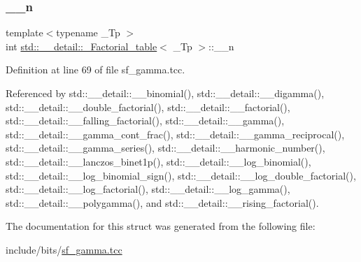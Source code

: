 \subsubsection{\texorpdfstring{\+\_\+\+\_\+n}{\_\_n}}
{\footnotesize\ttfamily template$<$typename \+\_\+\+Tp $>$ \\
int \hyperlink{structstd_1_1____detail_1_1__Factorial__table}{std\+::\+\_\+\+\_\+detail\+::\+\_\+\+Factorial\+\_\+table}$<$ \+\_\+\+Tp $>$\+::\+\_\+\+\_\+n}



Definition at line 69 of file sf\+\_\+gamma.\+tcc.



Referenced by std\+::\+\_\+\+\_\+detail\+::\+\_\+\+\_\+binomial(), std\+::\+\_\+\+\_\+detail\+::\+\_\+\+\_\+digamma(), std\+::\+\_\+\+\_\+detail\+::\+\_\+\+\_\+double\+\_\+factorial(), std\+::\+\_\+\+\_\+detail\+::\+\_\+\+\_\+factorial(), std\+::\+\_\+\+\_\+detail\+::\+\_\+\+\_\+falling\+\_\+factorial(), std\+::\+\_\+\+\_\+detail\+::\+\_\+\+\_\+gamma(), std\+::\+\_\+\+\_\+detail\+::\+\_\+\+\_\+gamma\+\_\+cont\+\_\+frac(), std\+::\+\_\+\+\_\+detail\+::\+\_\+\+\_\+gamma\+\_\+reciprocal(), std\+::\+\_\+\+\_\+detail\+::\+\_\+\+\_\+gamma\+\_\+series(), std\+::\+\_\+\+\_\+detail\+::\+\_\+\+\_\+harmonic\+\_\+number(), std\+::\+\_\+\+\_\+detail\+::\+\_\+\+\_\+lanczos\+\_\+binet1p(), std\+::\+\_\+\+\_\+detail\+::\+\_\+\+\_\+log\+\_\+binomial(), std\+::\+\_\+\+\_\+detail\+::\+\_\+\+\_\+log\+\_\+binomial\+\_\+sign(), std\+::\+\_\+\+\_\+detail\+::\+\_\+\+\_\+log\+\_\+double\+\_\+factorial(), std\+::\+\_\+\+\_\+detail\+::\+\_\+\+\_\+log\+\_\+factorial(), std\+::\+\_\+\+\_\+detail\+::\+\_\+\+\_\+log\+\_\+gamma(), std\+::\+\_\+\+\_\+detail\+::\+\_\+\+\_\+polygamma(), and std\+::\+\_\+\+\_\+detail\+::\+\_\+\+\_\+rising\+\_\+factorial().



The documentation for this struct was generated from the following file\+:\begin{DoxyCompactItemize}
\item 
include/bits/\hyperlink{sf__gamma_8tcc}{sf\+\_\+gamma.\+tcc}\end{DoxyCompactItemize}
